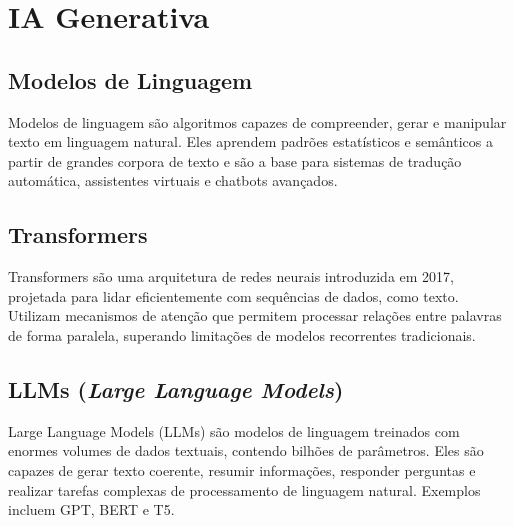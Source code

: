 \section{IA Generativa}
\subsection{Modelos de Linguagem}

Modelos de linguagem são algoritmos capazes de compreender, gerar e manipular texto em linguagem natural. Eles aprendem padrões estatísticos e semânticos a partir de grandes corpora de texto e são a base para sistemas de tradução automática, assistentes virtuais e chatbots avançados.

\subsection{Transformers}

Transformers são uma arquitetura de redes neurais introduzida em 2017, projetada para lidar eficientemente com sequências de dados, como texto. Utilizam mecanismos de atenção que permitem processar relações entre palavras de forma paralela, superando limitações de modelos recorrentes tradicionais.

\subsection{LLMs (\textit{Large Language Models})}

Large Language Models (LLMs) são modelos de linguagem treinados com enormes volumes de dados textuais, contendo bilhões de parâmetros. Eles são capazes de gerar texto coerente, resumir informações, responder perguntas e realizar tarefas complexas de processamento de linguagem natural. Exemplos incluem GPT, BERT e T5.
